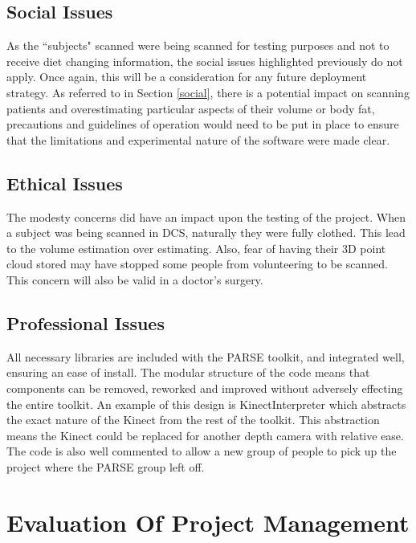 \subsection{Social Issues}
As the ``subjects" scanned were being scanned for testing purposes and not to receive diet changing information, the social issues highlighted previously do not apply. Once again, this will be a consideration for any future deployment strategy. As referred to in Section \ref{social}, there is a potential impact on scanning patients and overestimating particular aspects of their volume or body fat, precautions and guidelines of operation would need to be put in place to ensure that the limitations and experimental nature of the software were made clear.\\

\subsection{Ethical Issues}
The modesty concerns did have an impact upon the testing of the project. When a subject was being scanned in DCS, naturally they were fully clothed. This lead to the volume estimation over estimating. Also, fear of having their 3D point cloud stored may have stopped some people from volunteering to be scanned. This concern will also be valid in a doctor's surgery.\\

\subsection{Professional Issues}
All necessary libraries are included with the PARSE toolkit, and integrated well, ensuring an ease of install. The modular structure of the code means that components can be removed, reworked and improved without adversely effecting the entire toolkit. An example of this design is KinectInterpreter which abstracts the exact nature of the Kinect from the rest of the toolkit. This abstraction means the Kinect could be replaced for another depth camera with relative ease. The code is also well commented to allow a new group of people to pick up the project where the PARSE group left off.\\

\section{Evaluation Of Project Management}

